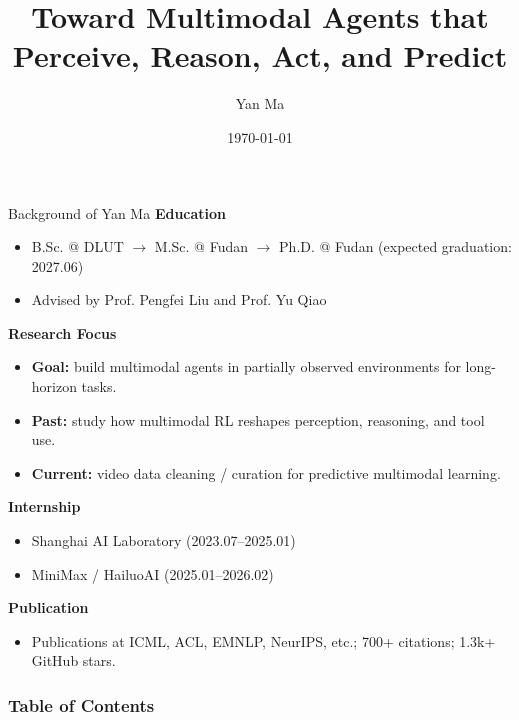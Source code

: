 \documentclass[aspectratio=169]{beamer}
\title{\fontsize{22}{22}\selectfont\bfseries Toward Multimodal Agents that\\[0.25em] Perceive, Reason, Act, and Predict\vspace{0.45cm}}
\author{\Large Yan Ma}
\institute{\large Fudan University \\[0.25em] \href{mailto:yanma23@m.fudan.edu.cn}{yanma23@m.fudan.edu.cn} \\[0.25em] \href{https://yanmaaaa.github.io/}{yanmaaaa.github.io}}
\date{\today}
\begin{document}
\maketitle

\begin{frame}{\LARGE Background of Yan Ma}
  \vspace{0.10cm}
  {\large\textbf{Education}}

  \begin{itemize}
    \footnotesize
    \setlength\itemsep{0.08em}
    \item B.Sc. @ DLUT $\rightarrow$ M.Sc. @ Fudan $\rightarrow$ Ph.D. @ Fudan {\scriptsize(expected graduation: 2027.06)}
    \item Advised by Prof. Pengfei Liu and Prof. Yu Qiao
  \end{itemize}

  \vspace{0.30cm}
  {\large\textbf{Research Focus}}

  \begin{itemize}
    \footnotesize
    \setlength\itemsep{0.08em}
    \item \textbf{Goal:} build multimodal agents in partially observed environments for long-horizon tasks.
    \item \textbf{Past:} study how multimodal RL reshapes perception, reasoning, and tool use.
    \item \textbf{Current:} video data cleaning / curation for predictive multimodal learning.
  \end{itemize}

  \vspace{0.30cm}
  {\large\textbf{Internship}}

  \begin{itemize}
    \footnotesize
    \setlength\itemsep{0.08em}
    \item Shanghai AI Laboratory {\scriptsize(2023.07--2025.01)}
    \item MiniMax / HailuoAI {\scriptsize(2025.01--2026.02)}
  \end{itemize}

  \vspace{0.30cm}
  {\large\textbf{Publication}}

  \begin{itemize}
    \footnotesize
    \setlength\itemsep{0.08em}
    \item Publications at ICML, ACL, EMNLP, NeurIPS, etc.; 700+ citations; 1.3k+ GitHub stars.
  \end{itemize}
\end{frame}

\begin{frame}
  \frametitle{\LARGE Table of Contents}
  \tableofcontents
\end{frame}

% 



% 

% 
\end{document}
